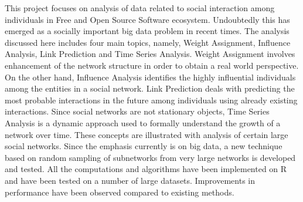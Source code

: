 


\begin{abstracts}        %

This project focuses on analysis of data related to social interaction among individuals in Free
and Open Source Software ecosystem. Undoubtedly this has emerged as a socially
important big data problem in recent times. The analysis discussed here includes four main topics,
namely, Weight Assignment, Influence Analysis, Link Prediction and Time Series Analysis.
Weight Assignment involves enhancement of the network structure in order to obtain
a real world perspective. On the other hand, Influence Analysis identifies the highly influential
individuals among the entities in a social network. Link Prediction deals with predicting
the most probable interactions in the future among individuals using already existing
interactions. Since social networks are not stationary objects, Time Series Analysis
is a dynamic approach used to formally understand the growth of
a network over time. These concepts are illustrated with analysis of certain large
social networks. Since the emphasis currently is on big data, a new technique based
on random sampling of subnetworks from very large networks is developed and tested.
All the computations and algorithms have been implemented on R and have been tested on a number of 
large datasets. Improvements in performance have been observed compared to existing methods. 
\end{abstracts}





